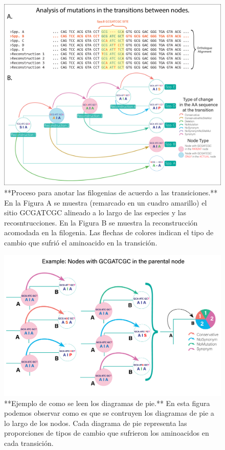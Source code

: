 \documentclass[
]{book}
\begin{document}
\begin{figure}

{\centering \includegraphics[width=1\linewidth]{Clados/Calothrix_B/figures/Reconstruction_explanation} 

}

\caption{**Proceso para anotar las filogenias de acuerdo a las transiciones.** En la Figura A se muestra (remarcado en un cuadro amarillo) el sitio GCGATCGC alineado a lo largo de las especies y las recosntrucciones. En la Figura B se muestra la reconstrucción acomodada en la filogenia. Las flechas de colores indican el tipo de cambio que sufrió el aminoacido en la transición.}\label{fig:FIG4x}
\end{figure}

\begin{figure}

{\centering \includegraphics[width=1\linewidth]{Clados/Calothrix_B/figures/transition example} 

}

\caption{**Ejemplo de como se leen los diagramas de pie.** En esta figura podemos observar como es que se contruyen los diagramas de pie a lo largo de los nodos. Cada diagrama de pie representa las proporciones de tipos de cambio que sufrieron los aminoacidos en cada transición.}\label{fig:EXAx}
\end{figure}
\end{document}
